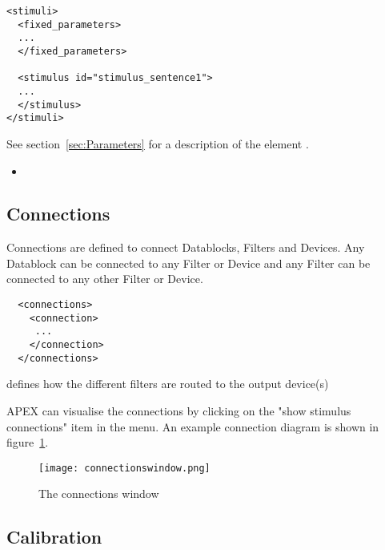 \begin{lstlisting}
<stimuli>
  <fixed_parameters>
  ...
  </fixed_parameters>

  <stimulus id="stimulus_sentence1">
  ...
  </stimulus>
</stimuli>
\end{lstlisting}



See section~\ref{sec:Parameters} for a description of the element .

\begin{itemize}
\item {}
\end{itemize}

\subsection{Connections}
\label{sec:Connections}


Connections are defined to connect Datablocks, Filters and Devices. Any
Datablock can be connected to any Filter or Device and any Filter can be connected to any other Filter
or Device.
\begin{lstlisting}
  <connections>
    <connection>
     ...
    </connection>
  </connections>

\end{lstlisting}

 defines how the different filters are
routed to the output device(s)

APEX can visualise the connections by clicking on the "show stimulus connections" item in the menu. An example connection diagram is shown in figure~\ref{fig:connections}.

\begin{figure}
 \centering
 \texttt{[image: connectionswindow.png]}
 \caption{The connections window}
 \label{fig:connections}
\end{figure}

\subsection{Calibration}
\label{sec:Calibration}


